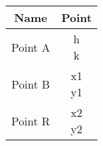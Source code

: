 \begin{tabular}[12pt]{ |c| c|}
    \hline
    \textbf{Name} & \textbf{Point}\\ 
    \hline
	Point A &\myvec{h \\ k}\\
    \hline 
 Point B &\myvec{x1 \\ y1}\\
    \hline
	  Point R &\myvec{x2 \\ y2}\\
    \hline
    
    \end{tabular}
